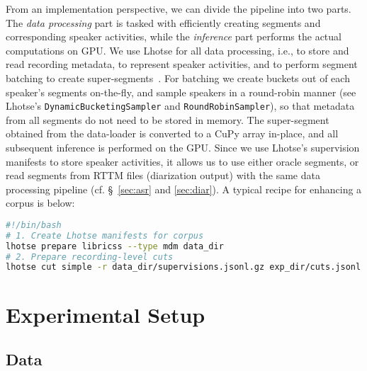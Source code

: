 \documentclass[a4paper]{article}
\begin{document}
From an implementation perspective, we can divide the pipeline into two parts. The \textit{data processing} part is tasked with efficiently creating segments and corresponding speaker activities, while the \textit{inference} part performs the actual computations on GPU. We use Lhotse for all data processing, i.e., to store and read recording metadata, to represent speaker activities, and to perform segment batching to create super-segments~\cite{zelasko2021LhotseAS}. For batching we create buckets out of each speaker's segments on-the-fly, and sample speakers in a round-robin manner (see Lhotse's \texttt{DynamicBucketingSampler} and \texttt{RoundRobinSampler}), so that metadata from all segments do not need to be stored in memory. The super-segment obtained from the data-loader is converted to a CuPy array in-place, and all subsequent inference is performed on the GPU. Since we use Lhotse's supervision manifests to store speaker activities, it allows us to use either oracle segments, or read segments from RTTM files (diarization output) with the same data processing pipeline (cf. \S~\ref{sec:asr} and \ref{sec:diar}). A typical recipe for enhancing a corpus is below:

\clearpage

\begin{lstlisting}[language=bash]
#!/bin/bash
# 1. Create Lhotse manifests for corpus
lhotse prepare libricss --type mdm data_dir
# 2. Prepare recording-level cuts
lhotse cut simple -r data_dir/supervisions.jsonl.gz exp_dir/cuts.jsonl.gz exp_dir/cuts.jsonl.gz exp_dir/enhanced
\end{lstlisting}

\section{Experimental Setup}

\subsection{Data}
\end{document}
